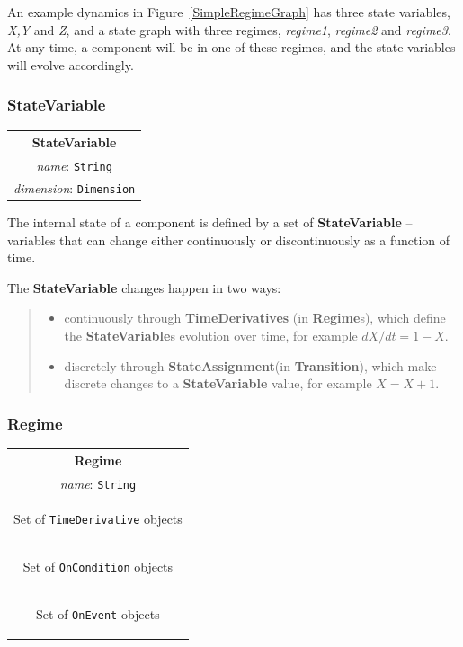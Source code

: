 \documentclass{article}
\newcommand{\StateVariable}{{\bf{StateVariable}}\xspace}
\newcommand{\StateVariables}{{\bf{StateVariable}}s\xspace}
\newcommand{\StateAssignment}{{\bf{StateAssignment}}\xspace}
\newcommand{\Regimes}{{\bf{Regime}}s\xspace}
\newcommand{\Transition}{{\bf{Transition}}\xspace}
\begin{document}
An example dynamics in Figure~\ref{SimpleRegimeGraph} has three state variables,
\emph{X,Y} and \emph{Z}, and a state graph with three regimes, \emph{regime1},
\emph{regime2} and \emph{regime3}. At any time, a component will be in one of
these regimes, and the state variables will evolve accordingly.

\subsubsection{StateVariable}
\label{state-var}


\begin{table}[htb]
\center
\begin{tabular}{|c|}
\hline
\hline
StateVariable \\
\hline
\hline
{\em name}: {\tt String} \\
\hline
{\em dimension}: {\tt Dimension} \\
\hline
\end{tabular}
\end{table}


The internal state of a component is defined by a set of \StateVariable
-- variables that can change either continuously or discontinuously as a
function of time.

The \StateVariable changes happen in two ways:
%
\begin{quote}
\begin{itemize}
\item continuously through \textbf{TimeDerivatives} (in \Regimes),
which define the \StateVariables evolution over time, for example
$dX/dt=1-X$.
\item discretely through \StateAssignment (in \Transition),
which make discrete changes to a \StateVariable value, for example
$X = X + 1$.
\end{itemize}
\end{quote}

\subsubsection{Regime}
\label{regime}


\begin{table}[htb]
\center
\begin{tabular}{|c|}
\hline
\hline
Regime \\
\hline
\hline
{\em name}: {\tt String} \\
\hline
\colorbox{issuecolor}{\parbox{0.4\linewidth}
{\center Set of {\tt TimeDerivative} objects}} \\
\hline
\colorbox{issuecolor}{\parbox{0.4\linewidth}
{\center Set of {\tt OnCondition} objects}} \\
\hline
\colorbox{issuecolor}{\parbox{0.4\linewidth}
{\center Set of {\tt OnEvent} objects}} \\
\hline
\end{tabular}
\end{table}
\end{document}
